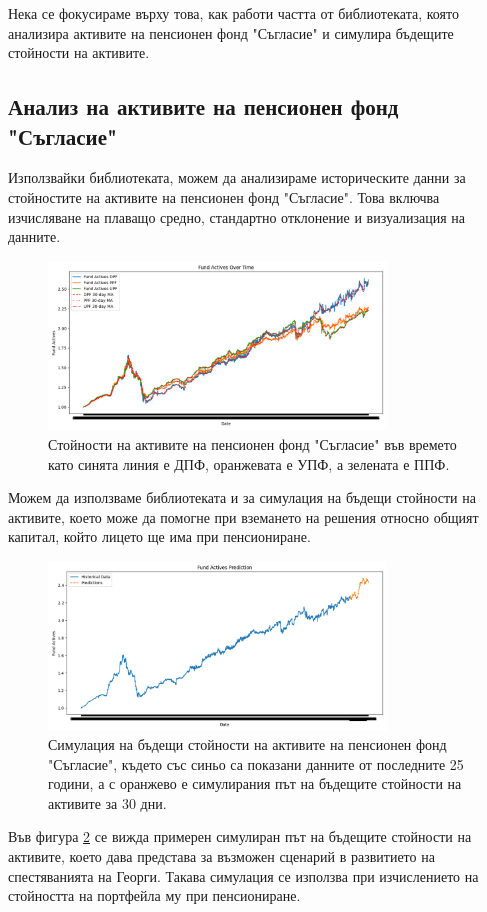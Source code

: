 \documentclass[a4paper,12pt]{article}
\begin{document}
Нека се фокусираме върху това, как работи частта от библиотеката, която анализира активите на пенсионен фонд "Съгласие" и симулира бъдещите стойности на активите.

\subsection{Анализ на активите на пенсионен фонд "Съгласие"}
Използвайки библиотеката, можем да анализираме историческите данни за стойностите на активите на пенсионен фонд "Съгласие". Това включва изчисляване на плаващо средно, стандартно отклонение и визуализация на данните.
\begin{figure}[ht]
        \centering
        \includegraphics[width=0.8\textwidth]{images/asset_values.png}
        \caption{Стойности на активите на пенсионен фонд "Съгласие" във времето като синята линия е ДПФ, оранжевата е УПФ, а зелената е ППФ.}
        \label{fig:asset_values}
\end{figure}
Можем да използваме библиотеката и за симулация на бъдещи стойности на активите, което може да помогне при вземането на решения относно общият капитал, който лицето ще има при пенсиониране.

\begin{figure}[ht]
        \centering
        \includegraphics[width=0.8\textwidth]{images/simulated_asset_values.png}
        \caption{Симулация на бъдещи стойности на активите на пенсионен фонд "Съгласие", където със синьо са показани данните от последните 25 години, а с оранжево е симулирания път на бъдещите стойности на активите за 30 дни.}
        \label{fig:simulated_asset_values}
\end{figure}
Във фигура \ref{fig:simulated_asset_values} се вижда примерен симулиран път на бъдещите стойности на активите, което дава представа за възможен сценарий в развитието на спестяванията на Георги. Такава симулация се използва при изчислението на стойността на портфейла му при пенсиониране.
\end{document}
